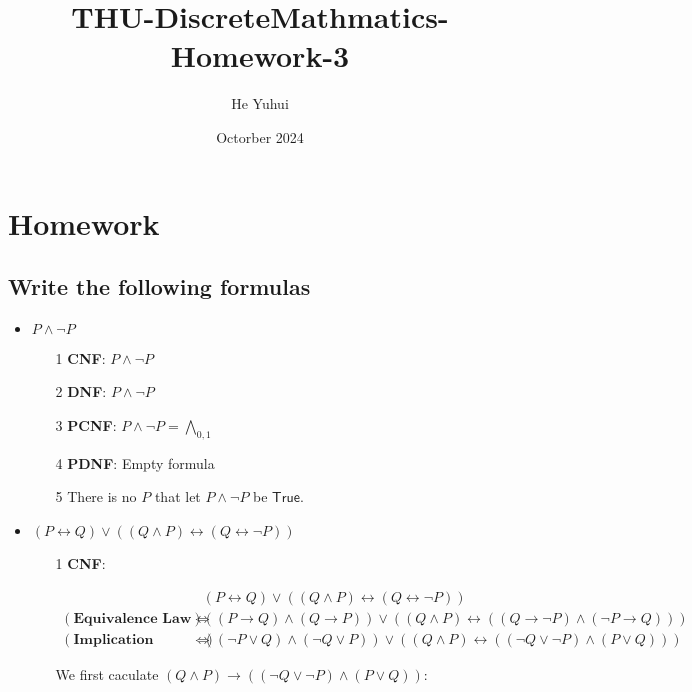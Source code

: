 \documentclass{article}
\title{THU-DiscreteMathmatics-Homework-3}
\author{He Yuhui\quad 2022012050}
\date{Octorber 2024}
\begin{document}
\maketitle

\section{Homework}

\subsection{Write the following formulas}

\begin{itemize}
    \item $P\wedge\lnot P$

    \begin{itemize}
        \item [1] \textbf{CNF}: $P\wedge\lnot P$
        \item [2] \textbf{DNF}: $P\wedge\lnot P$
        \item [3] \textbf{PCNF}: $P\wedge\lnot P=\bigwedge_{0,1}$
        \item [4] \textbf{PDNF}: Empty formula
        \item [5] There is no $P$ that let $P\wedge\lnot P$ be $\mathsf{True}$.
    \end{itemize}

    \item $(P\leftrightarrow Q)\vee((Q\wedge P)\leftrightarrow(Q\leftrightarrow\lnot P))$

    \begin{itemize}
        \item [1] \textbf{CNF}:
        
            $$
            \begin{aligned}
                &(P\leftrightarrow Q)\vee((Q\wedge P)\leftrightarrow(Q\leftrightarrow\lnot P))\\
                (\textbf{Equivalence Law})\Leftrightarrow&((P\rightarrow Q)\wedge(Q\rightarrow P))\vee((Q\wedge P)\leftrightarrow((Q\rightarrow\lnot P)\wedge(\lnot P\rightarrow Q)))\\
                (\textbf{Implication Equivalence})\Leftrightarrow&((\lnot P\vee Q)\wedge(\lnot Q\vee P))\vee((Q\wedge P)\leftrightarrow((\lnot Q\vee\lnot P)\wedge(P\vee Q)))
            \end{aligned}
            $$

            We first caculate $(Q\wedge P)\rightarrow((\lnot Q\vee\lnot P)\wedge(P\vee Q))$:


\end{itemize}
\end{itemize}
\end{document}
